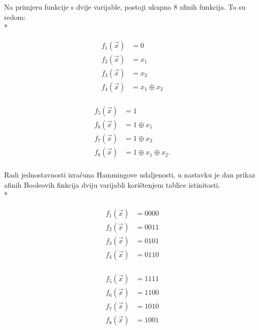 Na primjeru funkcije s dvije varijable, postoji ukupno $8$ afinih funkcija.
To su redom: \\*
\begin{minipage}[t]{.5\textwidth}
    \begin{equation*}
        \begin{aligned}
            f_1(\vec{x}) &= 0\\
            f_2(\vec{x}) &= x_1\\
            f_3(\vec{x}) &= x_2\\
            f_4(\vec{x}) &= x_1 \oplus x_2\\
        \end{aligned}
    \end{equation*}
\end{minipage}%
\begin{minipage}[t]{.5\textwidth}
    \begin{equation*}
        \begin{aligned}
            f_5(\vec{x}) &= 1\\
            f_6(\vec{x}) &= 1 \oplus x_1\\
            f_7(\vec{x}) &= 1 \oplus x_2\\
            f_8(\vec{x}) &= 1 \oplus x_1 \oplus x_2.\\
        \end{aligned}
    \end{equation*}
\end{minipage}
Radi jednostavnosti izračuna Hammingove udaljenosti, u nastavku je dan prikaz afinih Booleovih finkcija dviju varijabli korištenjem tablice istinitosti.\\*
\begin{minipage}[t]{.5\textwidth}
    \begin{equation*}
        \begin{aligned}
            f_1(\vec{x}) &= 0000\\
            f_2(\vec{x}) &= 0011\\
            f_3(\vec{x}) &= 0101\\
            f_4(\vec{x}) &= 0110\\
        \end{aligned}
    \end{equation*}
\end{minipage}%
\begin{minipage}[t]{.5\textwidth}
    \begin{equation*}
        \begin{aligned}
            f_5(\vec{x}) &= 1111\\
            f_6(\vec{x}) &= 1100\\
            f_7(\vec{x}) &= 1010\\
            f_8(\vec{x}) &= 1001\\
        \end{aligned}
    \end{equation*}
\end{minipage}
